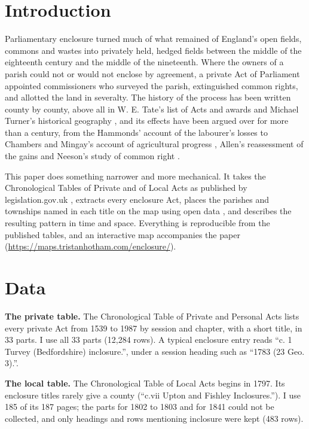 \documentclass[11pt,a4paper]{article}
\begin{document}
\section{Introduction}
Parliamentary enclosure turned much of what remained of England's open fields, commons and wastes into privately held, hedged fields between the middle of the eighteenth century and the middle of the nineteenth. Where the owners of a parish could not or would not enclose by agreement, a private Act of Parliament appointed commissioners who surveyed the parish, extinguished common rights, and allotted the land in severalty. The history of the process has been written county by county, above all in W. E. Tate's list of Acts and awards \citep{tate1978} and Michael Turner's historical geography \citep{turner1980}, and its effects have been argued over for more than a century, from the Hammonds' account of the labourer's losses \citep{hammond1911} to Chambers and Mingay's account of agricultural progress \citep{chambers1966}, Allen's reassessment of the gains \citep{allen1992} and Neeson's study of common right \citep{neeson1993}.

This paper does something narrower and more mechanical. It takes the Chronological Tables of Private and of Local Acts as published by legislation.gov.uk \citep{legpriv,legloc}, extracts every enclosure Act, places the parishes and townships named in each title on the map using open data \citep{wikidata}, and describes the resulting pattern in time and space. Everything is reproducible from the published tables, and an interactive map accompanies the paper (\url{https://maps.tristanhotham.com/enclosure/}).

\section{Data}
\textbf{The private table.} The Chronological Table of Private and Personal Acts lists every private Act from 1539 to 1987 by session and chapter, with a short title, in 33 parts. I use all 33 parts (12,284 rows). A typical enclosure entry reads ``c. 1 Turvey (Bedfordshire) inclosure.'', under a session heading such as ``1783 (23 Geo. 3).''.

\textbf{The local table.} The Chronological Table of Local Acts begins in 1797. Its enclosure titles rarely give a county (``c.vii Upton and Fishley Inclosures.''). I use 185 of its 187 pages; the parts for 1802 to 1803 and for 1841 could not be collected, and only headings and rows mentioning inclosure were kept (483 rows).
\end{document}
